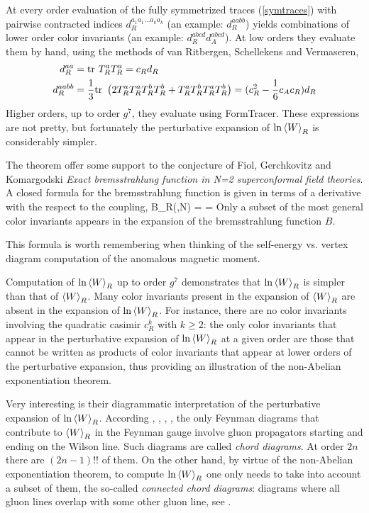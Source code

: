 At every order evaluation of the fully symmetrized traces
(\ref{symtraces}) with pairwise contracted indices
$d_R^{a_1 a_1\dots a_k a_k}$ (an example: $d_R^{aabb}$) yields
combinations of lower order color invariants (an example:
$d_R^{abcd}d_A^{abcd}$).
At low
orders they evaluate them by hand, using the methods of van Ritbergen,
Schellekens and Vermaseren,
\begin{align*}
d_R^{aa} & = \mbox{\rm tr}\,\,T_R^a T_R^a= c_R d_R \\
d_R^{aabb} & =  \frac{1}{3}\mbox{\rm tr}\,\,
\left(2T_R^aT_R^aT_R^bT_R^b+T_R^aT_R^bT_R^aT_R^b\right)
=(c_R^2-\frac{1}{6}c_A c_R)d_R
\end{align*}
Higher orders, up to order $g^{7}$, they evaluate using
FormTracer. These expressions are not pretty, but
fortunately the perturbative expansion of $\ln {\left< {W} \right>}_R$ is considerably
simpler.

The theorem offer some support to the conjecture of
Fiol, Gerchkovitz and Komargodski
{\em Exact bremsstrahlung function in {N}=2 superconformal field theories}.
A closed formula for the bremsstrahlung function is given in terms of a
derivative with the respect to the coupling,
\beq
B_R(\lambda,N)
=\lambda {}
= \cdots
{}
Only a subset of the most general color invariants appears in the
expansion of the bremsstrahlung function $B$.

This formula is worth remembering when thinking of the self-energy vs.
vertex diagram computation of the anomalous magnetic moment.

Computation of $\ln {\left< {W} \right>}_R$ up to order $g^{7}$ demonstrates that $\ln
{\left< {W} \right>}_R$ is simpler than that of ${\left< {W} \right>}_R$.
Many color invariants present in the expansion of ${\left< {W} \right>}_R$ are absent
in the expansion of $\ln {\left< {W} \right>}_R$. For instance, there are no color
invariants involving the quadratic casimir $c_R^k$ with $k\geq 2$: the
only color invariants that appear in the perturbative expansion of $\ln
{\left< {W} \right>}_R$ at a given order are those that cannot be written as products
of color invariants that appear at lower orders of the perturbative
expansion, thus providing an illustration of the non-Abelian
exponentiation theorem.

\medskip

Very interesting is their diagrammatic interpretation of the perturbative
expansion of $\ln {\left< {W} \right>}_R$. According
, ,
, , the only Feynman diagrams that
contribute to ${\left< {W} \right>}_R$ in the Feynman gauge involve gluon propagators
starting and ending on the Wilson line. Such diagrams are called
\emph{chord diagrams}. At order $2n$ there are $(2n-1)!!$
of them. On the other hand, by virtue of the non-Abelian exponentiation
theorem, to compute $\ln {\left< {W} \right>}_R$ one only
needs to take into account a subset of them, the so-called
\emph{connected chord diagrams}: diagrams where all gluon lines overlap
with some other gluon line, see .

